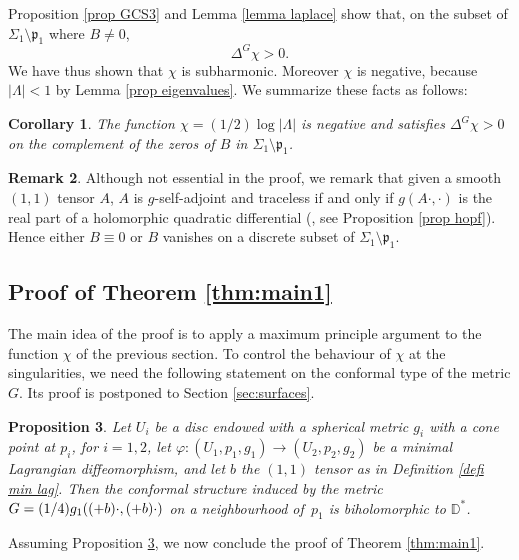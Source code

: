 \documentclass[11pt]{article}
\makeatletter
\DeclareRobustCommand{\mathbbm}[1]{\csname jepbb@#1\endcsname}
\newtheorem{cor}{Corollary}[section]
\newtheorem{prop}[cor]{Proposition}
\theoremstyle{definition}
\newtheorem{remark}[cor]{Remark}
\makeatother
\begin{document}
Proposition \ref{prop GCS3} and Lemma \ref{lemma laplace} show that, on the subset of $\Sigma_1\setminus\mathfrak p_1$ where $B\neq 0$,
\[
\Delta^G\chi> 0.
\]
We have thus shown that $\chi$ is subharmonic. Moreover $\chi$ is negative, because $|\Lambda|<1$ by Lemma \ref{prop eigenvalues}. We summarize these facts as follows:

\begin{cor}\label{cor subharmonic}
The function $\chi=(1/2)\log|\Lambda|$ is negative and satisfies $\Delta^G\chi>0$ on the complement of the zeros of $B$ in $\Sigma_1\setminus\mathfrak p_1$.
\end{cor}

\begin{remark}
Although not essential in the proof, we remark that given a smooth $(1,1)$ tensor $A$, $A$ is $g$-self-adjoint and traceless if and only if $g(A\cdot,\cdot)$ is the real part of a holomorphic quadratic differential (\cite{zbMATH03064601}, see Proposition \ref{prop hopf}). Hence either $B\equiv 0$ or $B$ vanishes on a discrete subset of $\Sigma_1\setminus\mathfrak p_1$.
\end{remark}

\subsection{Proof of Theorem \ref{thm:main1}}

The main idea of the proof is to apply a maximum principle argument to the function $\chi$ of the previous section. To control the behaviour of $\chi$ at the singularities, we need the following statement on the conformal type of the metric $G$. Its proof is postponed to Section \ref{sec:surfaces}.

\begin{prop}\label{prop:conf type}\label{lemma realize min lag}
Let $U_i$ be a disc endowed with a spherical metric $g_i$ with a cone point at $p_i$, for $i=1,2$, let $\varphi:(U_1,p_1,g_1)\to (U_2,p_2,g_2)$ be a minimal Lagrangian diffeomorphism, and let $b$ the $(1,1)$ tensor as in Definition \ref{defi min lag}.
Then the conformal structure induced by the metric $G=(1/4)g_1((\mathbbm 1+b)\cdot,(\mathbbm 1+b)\cdot)$ on a neighbourhood of~$p_1$ is biholomorphic to $\mathbb D^*$.
\end{prop}

Assuming Proposition \ref{prop:conf type}, we now conclude the proof of Theorem \ref{thm:main1}.
\end{document}
